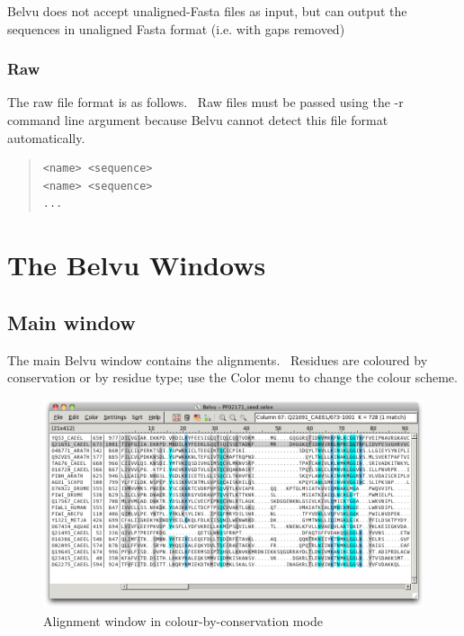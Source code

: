 \documentclass[letterpaper]{article}
\begin{document}
Belvu does not accept unaligned-Fasta files as input, but can output the sequences in unaligned Fasta format (i.e. with gaps removed)

\subsubsection[Raw]{Raw}
The raw file format is as follows. \ Raw files must be passed using the {\textasciigrave}-r{\textasciigrave} command line argument because Belvu cannot detect this file format automatically.

\begin{quote}
\begin{verbatim}
<name> <sequence>
<name> <sequence>
...
\end{verbatim}
\end{quote}

\section[The Belvu Windows]{The Belvu Windows}
\subsection[Main window]{Main window}
The main Belvu window contains the alignments. \ Residues are coloured by conservation or by residue type; use the Color menu to change the colour scheme.

\begin{figure}[htb]
\centering
\color{lightblue}
\includegraphics[width=\textwidth]{img_window_alignment_by_conservation.png}
\caption{Alignment window in colour-by-conservation mode}
\label{fig:belvu_cons}
\end{figure}
\end{document}
